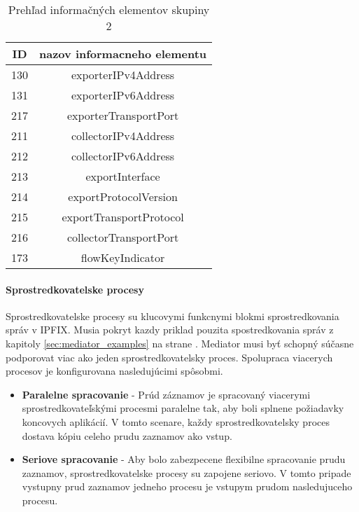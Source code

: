 \tabcolsep=8pt
\begin{table}[!ht]\caption{Prehľad informačných elementov skupiny 2}\label{t:ie-group2}
\smallskip
\centering
\begin{tabular}{|c|c|}
\hline
\textbf{ID} & \textbf{nazov informacneho elementu} \\ \hline
130 & exporterIPv4Address \\ \hline
131 & exporterIPv6Address \\ \hline
217 & exporterTransportPort \\ \hline
211 & collectorIPv4Address \\ \hline
212 & collectorIPv6Address \\ \hline
213 & exportInterface \\ \hline
214 & exportProtocolVersion \\ \hline
215 & exportTransportProtocol \\ \hline
216 & collectorTransportPort \\ \hline
173 & flowKeyIndicator \\ \hline
\end{tabular}
\end{table}

\paragraph{Sprostredkovatelske procesy} \label{sec:framework_intermediate}

Sprostredkovatelske procesy su klucovymi funkcnymi blokmi sprostredkovania správ v IPFIX. Musia pokryt 
kazdy priklad pouzita spostredkovania správ z kapitoly \ref{sec:mediator_examples} na strane 
\pageref{sec:mediator_examples}. 
Mediator musi byť schopný súčasne podporovat viac ako jeden sprostredkovatelsky proces. Spolupraca viacerych 
procesov je konfigurovana nasledujúcimi spôsobmi.

\begin{itemize}
 \item \textbf{Paralelne spracovanie} - Prúd záznamov je spracovaný viacerymi sprostredkovateľskými procesmi paralelne
tak, aby boli splnene požiadavky koncovych aplikácií. V tomto scenare, každy sprostredkovatelsky proces dostava
kópiu celeho prudu zaznamov ako vstup.
 \item \textbf{Seriove spracovanie} - Aby bolo zabezpecene flexibilne spracovanie prudu zaznamov, sprostredkovatelske
 procesy su zapojene seriovo. V tomto pripade vystupny prud zaznamov jedneho procesu je vstupym prudom nasledujuceho 
 procesu.
\end{itemize}






















